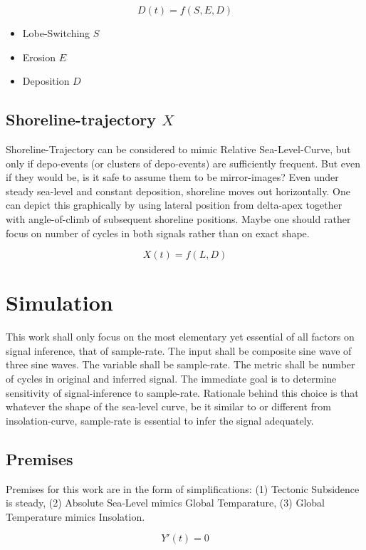 \documentclass[12pt]{article}
\begin{document}
$$
D(t) = f(S,E,D)
$$

\begin{itemize}
  \item Lobe-Switching $S$
  \item Erosion $E$
  \item Deposition $D$
\end{itemize}

\subsection*{Shoreline-trajectory $X$}

Shoreline-Trajectory can be considered to mimic Relative Sea-Level-Curve, but only if depo-events (or clusters of depo-events) are sufficiently frequent. But even if they would be, is it safe to assume them to be mirror-images? Even under steady sea-level and constant deposition, shoreline moves out horizontally. One can depict this graphically by using lateral position from delta-apex together with angle-of-climb of subsequent shoreline positions. Maybe one should rather focus on number of cycles in both signals rather than on exact shape.

$$
X(t) = f(L,D)
$$

\section*{Simulation}

This work shall only focus on the most elementary yet essential of all factors on signal inference, that of sample-rate. The input shall be composite sine wave of three sine waves. The variable shall be sample-rate. The metric shall be number of cycles in original and inferred signal. The immediate goal is to determine sensitivity of signal-inference to sample-rate. Rationale behind this choice is that whatever the shape of the sea-level curve, be it similar to or different from insolation-curve, sample-rate is essential to infer the signal adequately.

\subsection*{Premises}

Premises for this work are in the form of simplifications: (1) Tectonic Subsidence is steady, (2) Absolute Sea-Level mimics Global Temparature, (3) Global Temperature mimics Insolation.

$$
Y'(t) = 0
$$
\end{document}
